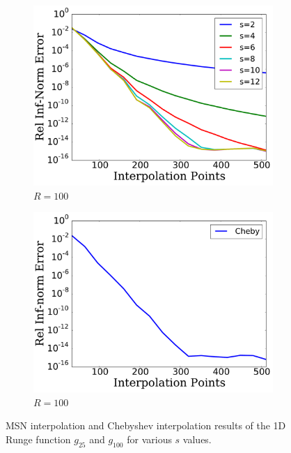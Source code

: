 \begin{figure}[p]
    \begin{subfigure}{0.45\textwidth}
    \includegraphics[width=\textwidth]{plots/msn_1d_smooth_R_100.pdf}
    \caption{$R=100$}
    \end{subfigure}
    \begin{subfigure}{0.45\textwidth}
    \includegraphics[width=\textwidth]{plots/cheby_1d_smooth_R_100.pdf}
    \caption{$R=100$}
    \end{subfigure}

\caption[Smooth Interpolation Comparison: 1D Runge Function]{
MSN interpolation and Chebyshev interpolation results of the
1D Runge function $g_{25}$ and $g_{100}$ for various $s$ values.
}
\label{fig:smooth_comparison_1d_runge}
\end{figure}



